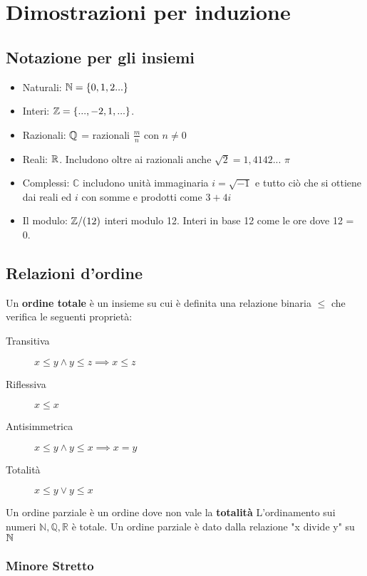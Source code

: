 \chapter{Dimostrazioni per induzione}

\section{Notazione per gli insiemi}

\begin{itemize}
	\item Naturali: $\mathbb{N} = \{0, 1, 2 ...\}$ 
	\item Interi: $\mathbb{Z} = \{..., -2, 1, ... \}$.
	\item Razionali: $\mathbb{Q}$ = razionali $\frac{m}{n}$ con  $n\ne 0$
	\item Reali: $\mathbb{R}$. Includono oltre ai razionali anche $\sqrt{2}=1,4142...$ $\pi$
	\item Complessi: $\mathbb{C}$ includono unità immaginaria $i =\sqrt{-1}$ e tutto ciò che si ottiene dai reali ed $i$ con somme e prodotti come $3 + 4i$
	\item Il modulo: $\mathbb{Z} /(12)$ interi modulo 12. Interi in base 12 come le ore dove 12 = 0.
\end{itemize}


\section{Relazioni d'ordine}

Un { \bf ordine totale} è un insieme su cui è definita una relazione binaria $\le$ che verifica le seguenti proprietà:

\begin{description}

\item [Transitiva] $x \le y \land y \le z \implies x \le z$ 
\item [Riflessiva] $x \le x$ 
\item [Antisimmetrica] $x \le y \land y \le x \implies x = y$
\item [Totalità] $x \le y \lor y \le x$ 
	
\end{description}

Un ordine parziale è un ordine dove non vale la {\bf totalità}
L'ordinamento sui numeri $\mathbb{N, Q, R}$ è totale.
Un ordine parziale è dato dalla relazione "x divide y" su $\mathbb{N}$


\subsection{Minore Stretto}

